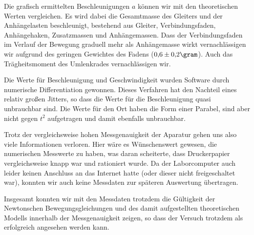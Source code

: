 \documentclass[a4paper,german,12pt,smallheadings]{scrartcl}
\begin{document}
Die grafisch ermittelten Beschleunigungen $a$ können wir mit den theoretischen
Werten vergleichen. Es wird dabei die Gesamtmasse des Gleiters und der
Anhängelasten beschleunigt, bestehend aus Gleiter, Verbindungsfaden,
Anhängehaken, Zusatzmassen und Anhängemassen. Dass der Verbindungsfaden im
Verlauf der Bewegung graduell mehr als Anhängemasse wirkt vernachlässigen wir
aufgrund des geringen Gewichtes des Fadens ($0{,}6 \pm 0{,}2 \gram$). Auch das
Trägheitsmoment des Umlenkrades vernachlässigen wir.

Die Werte für Beschleunigung und Geschwindigkeit wurden Software durch
numerische Differentiation gewonnen. Dieses Verfahren hat den Nachteil eines
relativ großen Jitters, so dass die Werte für die Beschleunigung quasi
unbrauchbar sind. Die Werte für den Ort haben die Form einer Parabel, sind aber
nicht gegen $t^2$ aufgetragen und damit ebenfalls unbrauchbar.

Trotz der vergleichsweise hohen Messgenauigkeit der Aparatur gehen uns also
viele Informationen verloren. Hier wäre es Wünschenswert gewesen, die
numerischen Messwerte zu haben, was daran scheiterte, dass Druckerpapier
vergleichsweise knapp war und rationiert wurde. Da der Laborcomputer auch
leider keinen Anschluss an das Internet hatte (oder dieser nicht freigeschaltet
war), konnten wir auch keine Messdaten zur späteren Auswertung übertragen.

Insgesamt konnten wir mit den Messdaten trotzdem die Gültigkeit der Newtonschen
Bewegungsgleichungen und des damit aufgestellten theoretischen Modells
innerhalb der Messgenauigkeit zeigen, so dass der Versuch trotzdem als
erfolgreich angesehen werden kann.
\end{document}
